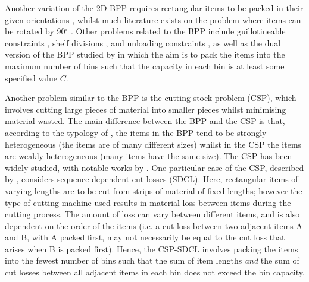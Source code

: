 \documentclass[a4paper,11pt,authoryear]{elsarticle}
\begin{document}
Another variation of the 2D-BPP requires rectangular items to be packed in their given orientations \citep{lodi1999, ntene2008}, whilst much literature exists on the problem where items can be rotated by 90$^\circ$ \citep{kenmochi2009, cui2013, he2013}. Other problems related to the BPP include guillotineable constraints \citep{bennell2018, kroger1995, hifi1998}, shelf divisions \citep{xavier2008}, and unloading constraints \citep{dasilveira2013}, as well as the dual version of the BPP studied by \citet{csirik1988} in which the aim is to pack the items into the maximum number of bins such that the capacity in each bin is at least some specified value $C$.


Another problem similar to the BPP is the cutting stock problem (CSP), which involves cutting large pieces of material into smaller pieces whilst minimising material wasted. The main difference between the BPP and the CSP is that, according to the typology of \citet{wascher2007}, the items in the BPP tend to be strongly heterogeneous (the items are of many different sizes) whilst in the CSP the items are weakly heterogeneous (many items have the same size). The CSP has been widely studied, with notable works by \citet{gilmore1961, gilmore1963}. One particular case of the CSP, described by \cite{garraffa2016}, considers sequence-dependent cut-losses (SDCL). Here, rectangular items of varying lengths are to be cut from strips of material of fixed lengths; however the type of cutting machine used results in material loss between items during the cutting process. The amount of loss can vary between different items, and is also dependent on the order of the items (i.e. a cut loss between two adjacent items A and B, with A packed first, may not necessarily be equal to the cut loss that arises when B is packed first). Hence, the CSP-SDCL involves packing the items into the fewest number of bins such that the sum of item lengths \emph{and} the sum of cut losses between all adjacent items in each bin does not exceed the bin capacity.
\end{document}
